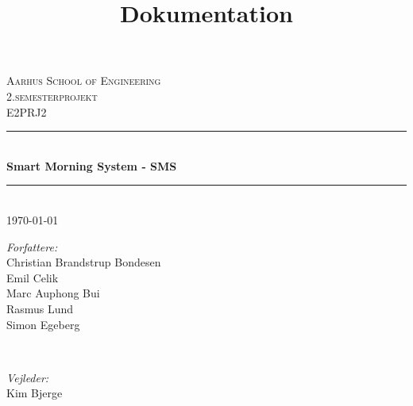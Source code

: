 \documentclass[11pt]{article}
\title{Dokumentation}
\begin{document}
\begin{titlepage}

\newcommand{\HRule}{\rule{\linewidth}{0.5mm}} %

\center %
 

\textsc{\LARGE Aarhus School of Engineering}\\[1.0cm] %
\textsc{\Large 2.semesterprojekt}\\[0.5cm] %
\textsc{\large E2PRJ2}\\[0.5cm] %


\HRule \\[0.6cm]
{ \huge \bfseries Smart Morning System - SMS}\\[0.4cm] %
\HRule \\[0.6cm]


{\large \today}\\[0.5cm] %
 

\begin{minipage}[t]{0.4\textwidth}
\begin{flushleft} \large
\emph{Forfattere:}\\
Christian Brandstrup Bondesen\\
Emil Celik\\
Marc Auphong Bui\\
Rasmus Lund\\
Simon Egeberg

\end{flushleft}
\end{minipage}
~
\begin{minipage}[t]{0.4\textwidth}
\begin{flushright} \large
\emph{Vejleder:} \\
Kim Bjerge %
\vfill
\end{flushright}
\end{minipage}\\[0.8cm]



\end{titlepage}
\end{document}
